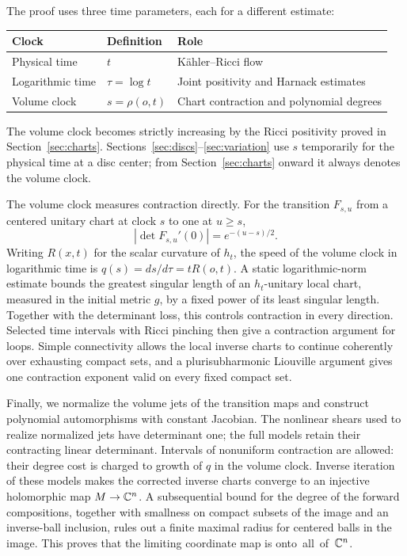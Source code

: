 The proof uses three time parameters, each for a different estimate:
\begin{center}
\begin{tabular}{lll}
\toprule
Clock & Definition & Role \\
\midrule
Physical time & $t$ & K\"ahler--Ricci flow \\
Logarithmic time & $\tau=\log t$ & Joint positivity and Harnack estimates \\
Volume clock & $s=\rho(o,t)$ & Chart contraction and polynomial degrees \\
\bottomrule
\end{tabular}
\end{center}
The volume clock becomes strictly increasing by the Ricci positivity
proved in Section~\ref{sec:charts}.  Sections~\ref{sec:discs}--\ref{sec:variation}
use $s$ temporarily for the physical time at a disc center; from
Section~\ref{sec:charts} onward it always denotes the volume clock.

The volume clock measures contraction directly.  For the transition
$F_{s,u}$ from a centered unitary chart at clock $s$ to one at $u\ge s$,
\[
 |\det F_{s,u}'(0)|=e^{-(u-s)/2}.
\]
Writing $R(x,t)$ for the scalar curvature of $h_t$, the speed of the
volume clock in logarithmic time is $q(s)=ds/d\tau=tR(o,t)$.
A static logarithmic-norm estimate bounds the greatest singular length
of an $h_t$-unitary local chart, measured in the initial metric $g$,
by a fixed power of its least singular length.  Together with the
determinant loss, this controls contraction in every direction.
Selected time intervals with Ricci pinching then give a contraction
argument for loops.  Simple connectivity allows the local inverse
charts to continue coherently over exhausting compact sets, and a
plurisubharmonic Liouville argument gives one contraction exponent
valid on every fixed compact set.

Finally, we normalize the volume jets of the transition maps and
construct polynomial automorphisms with constant Jacobian.  The
nonlinear shears used to realize normalized jets have determinant
one; the full models retain their contracting linear determinant.
Intervals of nonuniform contraction are allowed: their degree
cost is charged to growth of $q$ in the volume clock.
Inverse iteration of these models makes the corrected inverse charts
converge to an injective holomorphic map $M\to\mathbb C^n$.
A subsequential bound for the degree of the forward compositions,
together with smallness on compact subsets of the image and an
inverse-ball inclusion, rules out a finite maximal radius for centered
balls in the image.
This proves that the limiting coordinate map is onto~all~of~$\mathbb C^n$.

